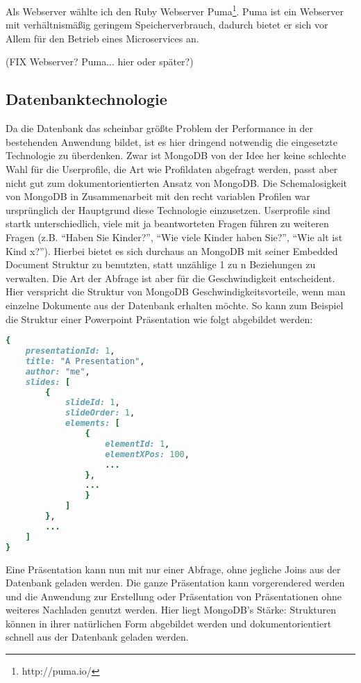 Als Webserver wählte ich den Ruby Webserver Puma\footnote{http://puma.io/}. Puma ist ein Webserver mit verhältnismäßig geringem Speicherverbrauch, dadurch bietet er sich vor Allem für den Betrieb eines Microservices an.

(FIX Webserver? Puma... hier oder später?)

\subsection{Datenbanktechnologie}
Da die Datenbank das scheinbar größte Problem der Performance in der bestehenden Anwendung bildet, ist es hier dringend notwendig die eingesetzte Technologie zu überdenken. Zwar ist MongoDB von der Idee her keine schlechte Wahl für die Userprofile, die Art wie Profildaten abgefragt werden, passt aber nicht gut zum dokumentorientierten Ansatz von MongoDB.
Die Schemalosigkeit von MongoDB in Zusammenarbeit mit den recht variablen Profilen war ursprünglich der Hauptgrund diese Technologie einzusetzen. Userprofile sind startk unterschiedlich, viele mit ja beantworteten Fragen führen zu weiteren Fragen (z.B. ``Haben Sie Kinder?'', ``Wie viele Kinder haben Sie?'', ``Wie alt ist Kind x?''). Hierbei bietet es sich durchaus an MongoDB mit seiner Embedded Document Struktur zu benutzten, statt unzählige 1 zu n Beziehungen zu verwalten. Die Art der Abfrage ist aber für die Geschwindigkeit entscheident. Hier verspricht die Struktur von MongoDB Geschwindigkeitsvorteile, wenn man einzelne Dokumente aus der Datenbank erhalten möchte. So kann zum Beispiel die Struktur einer Powerpoint Präsentation wie folgt abgebildet werden:
\begin{lstlisting}[language=Ruby]
{
    presentationId: 1,
    title: "A Presentation",
    author: "me",
    slides: [
        {
            slideId: 1,
            slideOrder: 1,
            elements: [
                {
                    elementId: 1,
                    elementXPos: 100,
                    ...
                },
                ...
                }
            ]
        },
        ...
    ]
}
\end{lstlisting}
Eine Präsentation kann nun mit nur einer Abfrage, ohne jegliche Joins aus der Datenbank geladen werden. Die ganze Präsentation kann vorgerendered werden und die Anwendung zur Erstellung oder Präsentation von Präsentationen ohne weiteres Nachladen genutzt werden. Hier liegt MongoDB's Stärke: Strukturen können in ihrer natürlichen Form abgebildet werden und dokumentorientiert schnell aus der Datenbank geladen werden.
